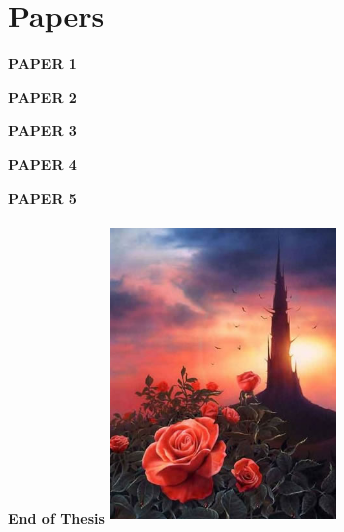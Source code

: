 \backmatter

\chapter{Papers}
\newpage

\begin{center}
\textbf{\fontsize{70}{1} \selectfont PAPER 1}
\end{center}



\begin{center}
\textbf{\fontsize{70}{1} \selectfont PAPER 2}
\end{center}



\begin{center}
\textbf{\fontsize{70}{1} \selectfont PAPER 3}
\end{center}



\begin{center}
\textbf{\fontsize{70}{1} \selectfont PAPER 4}
\end{center}



\begin{center}
\textbf{\fontsize{70}{1} \selectfont PAPER 5}
\end{center}



\begin{center}
\textbf{\fontsize{70}{1} \selectfont End of Thesis}
\vfill
\includegraphics[width=6cm, height=8cm]{img/rose.jpg}
\end{center}
\thispagestyle{empty}

%
